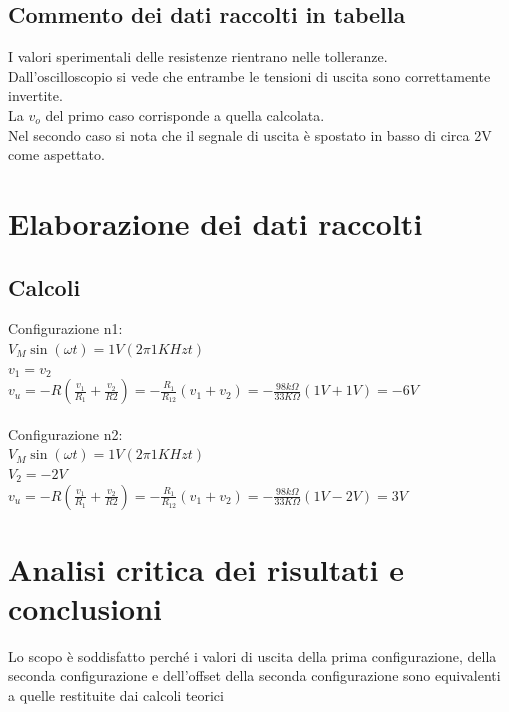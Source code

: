 \documentclass[12pt]{article}
\begin{document}
\subsection{Commento dei dati raccolti in tabella}
I valori sperimentali delle resistenze rientrano nelle tolleranze.\\
Dall'oscilloscopio si vede che entrambe le tensioni di uscita sono correttamente invertite.\\
La $v_o$ del primo caso corrisponde a quella calcolata.\\
Nel secondo caso si nota che il segnale di uscita è spostato in basso di circa 2V come aspettato.\\
\section{Elaborazione dei dati raccolti}
\subsection{Calcoli}
Configurazione n1:\\
$V_M\sin (\omega t)=1V(2\pi1KHzt)$\\
$v_1=v_2$\\
$v_u=-R(\frac{v_1}{R_1}+\frac{v_2}{R2})=-\frac{R_1}{R_{12}}(v_1+v_2)=-\frac{98k\Omega}{33K\Omega}(1V+1V)=-6V$\\
\\
Configurazione n2:\\
$V_M\sin (\omega t)=1V(2\pi1KHzt)$\\
$V_2=-2V$\\
$v_u=-R(\frac{v_1}{R_1}+\frac{v_2}{R2})=-\frac{R_1}{R_{12}}(v_1+v_2)=-\frac{98k\Omega}{33K\Omega}(1V-2V)=3V$
\section{Analisi critica dei risultati e conclusioni}
Lo scopo è soddisfatto perché i valori di uscita della prima configurazione, della seconda configurazione e dell'offset
della seconda configurazione sono equivalenti a quelle restituite dai calcoli teorici
\end{document}
